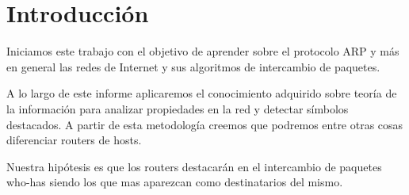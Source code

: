 \section{Introducción}

Iniciamos este trabajo con el objetivo de aprender sobre el protocolo ARP y más en general las redes de Internet y sus algoritmos de intercambio de paquetes.

A lo largo de este informe aplicaremos el conocimiento adquirido sobre teoría de la información para analizar propiedades en la red y detectar símbolos destacados. A partir de esta metodología creemos que podremos entre otras cosas diferenciar routers de hosts.

Nuestra hipótesis es que los routers destacarán en el intercambio de paquetes who-has siendo los que mas aparezcan como destinatarios del mismo.
